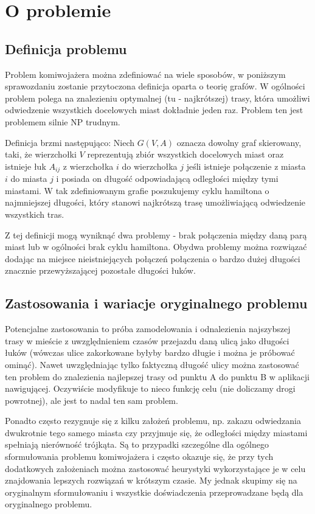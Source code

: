 \section{O problemie}
\subsection{Definicja problemu}
Problem komiwojażera można zdefiniować na wiele sposobów, w poniższym sprawozdaniu zostanie przytoczona definicja oparta o teorię grafów. W ogólności problem polega na znalezieniu optymalnej (tu - najkrótszej) trasy, która umożliwi odwiedzenie wszystkich docelowych miast dokładnie jeden raz. Problem ten jest problemem silnie NP trudnym.

Definicja brzmi następująco: Niech $G(V,A)$ oznacza dowolny graf skierowany, taki, że wierzchołki $V$ reprezentują zbiór wszystkich docelowych miast oraz istnieje łuk $A_{ij}$ z wierzchołka $i$ do wierzchołka $j$ jeśli istnieje połączenie z miasta $i$ do miasta $j$ i posiada on długość odpowiadającą odległości między tymi miastami. W tak zdefiniowanym grafie poszukujemy cyklu hamiltona o najmniejszej długości, który stanowi najkrótszą trasę umożliwiającą odwiedzenie wszystkich tras.

Z tej definicji mogą wyniknąć dwa problemy - brak połączenia między daną parą miast lub w ogólności brak cyklu hamiltona. Obydwa problemy można rozwiązać dodając na miejsce nieistniejących połączeń połączenia o bardzo dużej długości znacznie przewyższającej pozostałe długości łuków.

\subsection{Zastosowania i wariacje oryginalnego problemu}
Potencjalne zastosowania to próba zamodelowania i odnalezienia najszybszej trasy w mieście z uwzględnieniem czasów przejazdu daną ulicą jako długości łuków (wówczas ulice zakorkowane byłyby bardzo długie i można je próbować ominąć). Nawet uwzględniając tylko faktyczną długość ulicy można zastosować ten problem do znalezienia najlepszej trasy od punktu A do punktu B w aplikacji nawigującej. Oczywiście modyfikuje to nieco funkcję celu (nie doliczamy drogi powrotnej), ale jest to nadal ten sam problem.

Ponadto często rezygnuje się z kilku założeń problemu, np. zakazu odwiedzania dwukrotnie tego samego miasta czy przyjmuje się, że odległości między miastami spełniają nierówność trójkąta. Są to przypadki szczególne dla ogólnego sformułowania problemu komiwojażera i często okazuje się, że przy tych dodatkowych założeniach można zastosować heurystyki wykorzystające je w celu znajdowania lepszych rozwiązań w krótszym czasie. My jednak skupimy się na oryginalnym sformułowaniu i wszystkie doświadczenia przeprowadzane będą dla oryginalnego problemu.